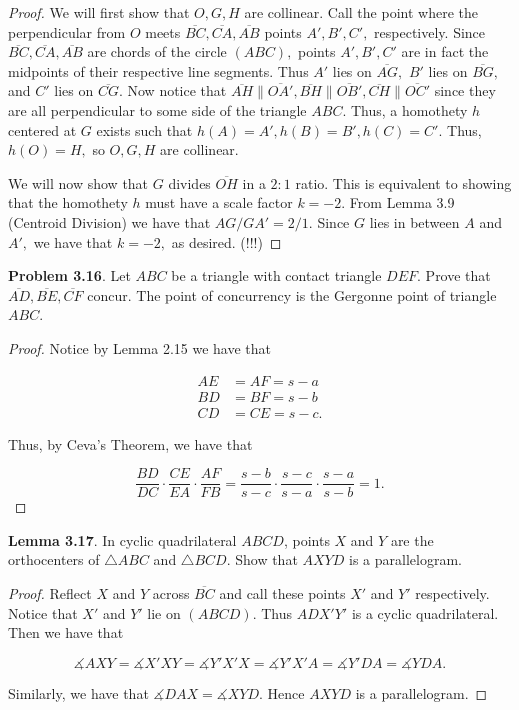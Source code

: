\documentclass[letterpaper,oneside]{book}
\begin{document}
 \begin{proof}  We will first show that $O,G,H$ are collinear. Call the point where the perpendicular from $O$ meets $\overline{BC},\overline{CA}, \overline{AB}$ points $A',B',C',$ respectively. Since $\overline{BC},\overline{CA}, \overline{AB}$ are chords of the circle $(ABC),$ points $A',B',C'$ are in fact the midpoints of their respective line segments. Thus $A'$ lies on $\overline{AG},$ $B'$ lies on $\overline{BG},$ and $C'$ lies on $\overline{CG}.$ Now notice that $\overline{AH} \parallel \overline{OA'}, \overline{BH} \parallel \overline{OB'}, \overline{CH} \parallel \overline{OC'}$ since they are all perpendicular to some side of the triangle $ABC.$  Thus, a homothety $h$ centered at $G$ exists such that $h(A) = A', h(B) = B', h(C) = C'.$ Thus, $h(O) = H,$ so $O,G,H$ are collinear. 

We will now show that $G$ divides $\overline{OH}$ in a $2:1$ ratio. This is equivalent to showing that the homothety $h$ must have a scale factor $k = -2.$ From Lemma 3.9 (Centroid Division) we have that $AG/GA' = 2/1.$ Since $G$ lies in between $A$ and $A',$ we have that $k=-2,$ as desired. (!!!) \end{proof}



  \textbf{Problem 3.16}.   Let $ABC$ be a triangle with contact triangle $DEF$. Prove that $\overline{AD}, \overline{BE}, \overline{CF}$ concur. The point of concurrency is the Gergonne point of triangle $ABC$.

\begin{proof}
  Notice by Lemma 2.15 we have that 

\begin{align*}
AE &= AF = s-a\\
BD &= BF = s-b\\
CD &= CE = s-c.
\end{align*}

Thus, by Ceva's Theorem, we have that

$$\frac{BD}{DC}\cdot\frac{CE}{EA}\cdot\frac{AF}{FB} = \frac{s-b}{s-c}\cdot\frac{s-c}{s-a}\cdot\frac{s-a}{s-b} =1.$$
\end{proof}



  \textbf{Lemma 3.17}.   In cyclic quadrilateral $ABCD$, points $X$ and $Y$ are the orthocenters of $\triangle ABC$ and $\triangle BCD.$ Show that  $AXYD$ is a parallelogram.

 \begin{proof}  Reflect $X$ and $Y$ across $\overline{BC}$ and call these points $X'$ and $Y'$ respectively. Notice that $X'$ and $Y'$ lie on $({ABCD}).$ Thus ${ADX'Y'}$ is a cyclic quadrilateral. Then we have that

$$\measuredangle {AXY} = \measuredangle {X'XY}= \measuredangle {Y'X'X} = \measuredangle {Y'X'A} = \measuredangle {Y'DA} = \measuredangle {YDA}.$$

Similarly, we have that $\measuredangle {DAX} = \measuredangle {XYD}.$ Hence ${AXYD}$ is a parallelogram. \end{proof}
\end{document}
